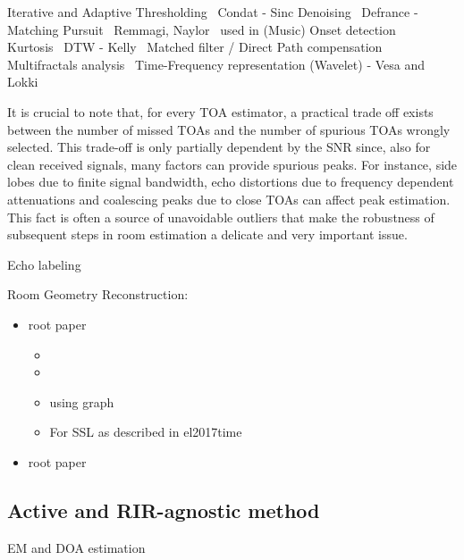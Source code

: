 Iterative and Adaptive Thresholding~
Condat - Sinc Denoising~
Defrance - Matching Pursuit~
Remmagi, Naylor~ used in 
(Music) Onset detection~
Kurtosis~
DTW - Kelly~
Matched filter / Direct Path compensation~
Multifractals analysis~
Time-Frequency representation (Wavelet) - Vesa and Lokki 


It is crucial to note that, for every TOA estimator, a practical trade off exists between the
number of missed TOAs and the number of spurious TOAs wrongly selected.
This trade-off is only partially dependent by the SNR since, also for clean received signals, many factors can provide spurious peaks.
For instance, side lobes due to finite signal bandwidth, echo distortions due to frequency dependent attenuations and coalescing peaks due to close TOAs can affect peak estimation.
This fact is often a source of unavoidable outliers that make the robustness of subsequent steps in room estimation a delicate and very important issue.

Echo labeling

Room Geometry Reconstruction:
\begin{itemize}
    \item {} root paper
    \begin{itemize}
        \item {}
        \item {}
        \item {} using graph
        \item For SSL as described in el2017time 
    \end{itemize}
    \item {} root paper
\end{itemize}


\subsection{Active and RIR-agnostic method}
EM and DOA estimation 

